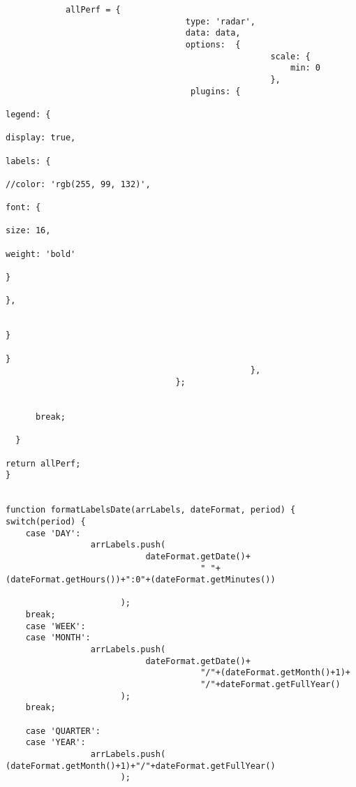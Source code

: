 \begin{lstlisting}
            allPerf = {
                                    type: 'radar',
                                    data: data,
                                    options:  {
                                                     scale: {
                                                         min: 0
                                                     },
                                     plugins: {
                                                                                     legend: {
                                                                                         display: true,
                                                                                         labels: {
                                                                                             //color: 'rgb(255, 99, 132)',
                                                                                              font: {
                                                                                                 size: 16,
                                                                                                 weight: 'bold'
                                                                                              }
                                                                                         },

                                                                                     }
                                                                                 }
                                                 },
                                  };


      break;

  }

return allPerf;
}


function formatLabelsDate(arrLabels, dateFormat, period) {
switch(period) {
    case 'DAY':
                 arrLabels.push(
                            dateFormat.getDate()+
                                       " "+(dateFormat.getHours())+":0"+(dateFormat.getMinutes())

                       );
    break;
    case 'WEEK':
    case 'MONTH':
                 arrLabels.push(
                            dateFormat.getDate()+
                                       "/"+(dateFormat.getMonth()+1)+
                                       "/"+dateFormat.getFullYear()
                       );
    break;

    case 'QUARTER':
    case 'YEAR':
                 arrLabels.push(
(dateFormat.getMonth()+1)+"/"+dateFormat.getFullYear()
                       );


\end{lstlisting}
